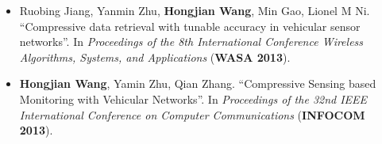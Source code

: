 \begin{itemize}
\item Ruobing Jiang, Yanmin Zhu, \textbf{Hongjian Wang}, Min Gao, Lionel M Ni. ``Compressive data retrieval with tunable accuracy in vehicular sensor networks''. In \emph{Proceedings of the 8th International Conference Wireless Algorithms, Systems, and Applications} (\textbf{WASA 2013}).
\item \textbf{Hongjian Wang}, Yamin Zhu, Qian Zhang. ``Compressive Sensing based Monitoring with Vehicular Networks''. In \emph{Proceedings of the 32nd IEEE International Conference on Computer Communications} (\textbf{INFOCOM 2013}).
\end{itemize}

